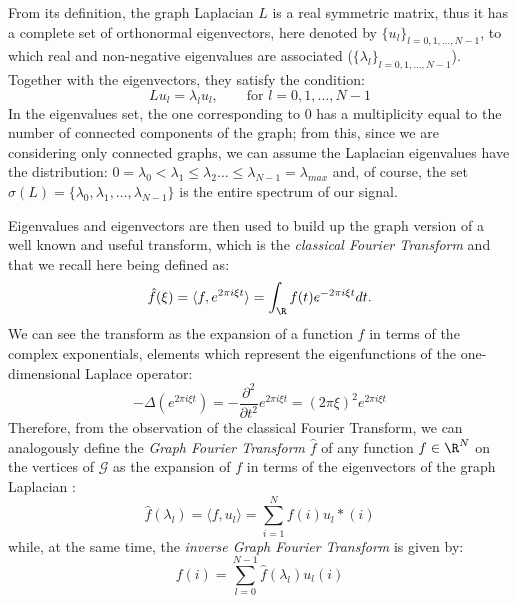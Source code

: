 From its definition, the graph Laplacian $L$ is a real symmetric matrix, thus it has a complete set of orthonormal eigenvectors, here denoted by $\{u_l\}_{l=0,1,\dots,N-1}$, to which real and non-negative eigenvalues are associated ($\{\lambda_l\}_{l=0,1,\dots,N-1}$). Together with the eigenvectors, they satisfy the condition:
\begin{equation}
L u_l = \lambda_l u_l, \qquad \text{for  } l = 0,1,\dots,N-1
\end{equation}
In the eigenvalues set, the one corresponding to $0$ has a multiplicity equal to the number of connected components of the graph; from this, since we are considering only connected graphs, we can assume the Laplacian eigenvalues have the distribution: $0 = \lambda_0 < \lambda_1 \leq \lambda_2 \dots \leq \lambda_{N-1} = \lambda_{max}$ and, of course, the set $\sigma(L) = \{\lambda_0, \lambda_1,\dots,\lambda_{N-1}\}$ is the entire spectrum of our signal.

Eigenvalues and eigenvectors are then used to build up the graph version of a well known and useful transform, which is the \textit{classical Fourier Transform} and that we recall here being defined as:
\begin{equation}
\hat{f}(\xi) = \langle f, e^{2\pi i \xi t}\rangle = \int_{\R} f(t)e^{-2\pi i \xi t} dt.
\end{equation}
We can see the transform as the expansion of a function $f$ in terms of the complex exponentials, elements which represent the eigenfunctions of the one-dimensional Laplace operator:
\begin{equation}
-\Delta(e^{2\pi i \xi t}) = -\frac{\partial^2}{\partial t^2}e^{2\pi i \xi t} = (2\pi\xi)^2e^{2\pi i \xi t}
\end{equation}
Therefore, from the observation of the classical Fourier Transform, we can analogously define the \textit{Graph Fourier Transform} $\hat{f}$ of any function $f \in \R^N$ on the vertices of $\mathcal{G}$ as the expansion of $f$ in terms of the eigenvectors of the graph Laplacian \cite{Shuman2013}:
\begin{equation}
\hat{f}(\lambda_l) = \langle f, u_l \rangle = \sum^{N}_{i=1}f(i)u_l*(i)
\end{equation}
while, at the same time, the \textit{inverse Graph Fourier Transform} is given by:
\begin{equation}
f(i) = \sum^{N-1}_{l = 0}\hat{f}(\lambda_l)u_l(i)
\end{equation}
